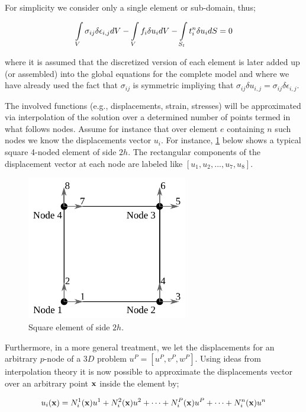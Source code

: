 For simplicity we consider only a single element or sub-domain, thus;

\begin{equation}\label{pvw_sing}
\int\limits_V \sigma_{ij} \delta\epsilon_{i,j} dV - \int\limits_V f_i\delta u_idV - \int\limits_{S_t} t_i^n \delta u_i dS = 0
\end{equation}

where it is assumed that the discretized version of each element is later added up (or assembled) into the global equations for the complete model and where we have already used the fact that $\sigma_{ij}$ is symmetric impliying that $\sigma_{ij} \delta u_{i,j} = \sigma_{ij} \delta\epsilon_{i,j}$.

The involved functions (e.g., displacements, strain, stresses) will be approximated via interpolation of the solution over a determined number of points termed in what follows nodes. Assume for instance that over element $e$ containing $n$ such nodes we know the displacements vector $u_i$. For instance, \cref{fig:simple element} below shows a typical square 4-noded element of side $2h$. The rectangular components of the displacement vector at each node are labeled like $[u_1, u_2,...,u_7, u_8]$.

\begin{figure}[H]
\centering
\includegraphics[width=7cm]{lado2h.pdf}
\caption{Square element of side $2h$.}
\label{fig:simple element}
\end{figure}


Furthermore, in a more general treatment, we let the displacements for an arbitrary $p$-node of a $3D$ problem $u^P=[u^P, v^P, w^P]$. Using ideas from interpolation theory it is now possible to approximate the displacements vector over an arbitrary point $\vb{x}$ inside the element by;

\[u_i(\vb x) = N_i^1(\vb x)u^1 + N_i^2(\vb x)u^2 + \cdots + N_i^P(\vb x)u^P + \cdots + N_i^n(\vb x)u^n\]

